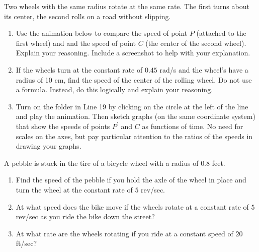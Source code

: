 \documentclass{ximera}
\begin{document}
\begin{exploration}\label{exp:angles2}
Two wheels with the same radius rotate at the same rate. The first turns about its center, the second rolls on a road without slipping.

\begin{enumerate}
\item Use the animation below to compare the speed of point $P$ (attached to the first wheel) and and the speed of point $C$ (the center of the second wheel). Explain your reasoning. Include a screenshot to help with your explanation.

\item If the wheels turn at the constant rate of $0.45$ rad/s and the wheel's have a radius of 10 cm, find the speed of the center of the rolling wheel. Do not use a  formula. Instead, do this logically and explain your reasoning. 

\item Turn on the folder in Line 19 by clicking on the circle at the left of the line and play the animation. Then sketch graphs (on the same coordinate system) that show the speeds of points $P^\prime$ and $C$ as functions of time. No need for scales on the axes, but pay particular attention to the ratios of the speeds in drawing  your graphs.

\end{enumerate}

 
\begin{onlineOnly}
    \begin{center}
\end{center}
\end{onlineOnly}
\end{exploration}

\begin{question} \label{Qdsfdsf4rt5yy55t}
A pebble is stuck in the tire of a bicycle wheel with a radius of $0.8$ feet. 
\begin{enumerate}
\item Find the speed of the pebble if you hold the axle of the wheel in place and turn the wheel at the constant rate of $5$ rev/sec.

\item At what speed does the bike move if the wheels rotate at a constant rate of $5$ rev/sec as you ride the bike down the street?

\item At what rate are the wheels rotating if you ride at a constant speed of $20$ ft/sec?

\end{enumerate}

\end{question}
\end{document}
